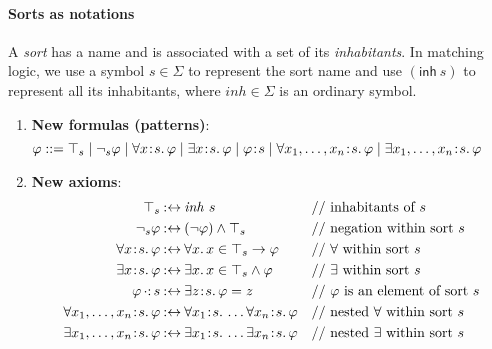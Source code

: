 \documentclass{article}
\theoremstyle{plain}
\theoremstyle{definition}
\newcommand{\cln}{{\kern0.2ex:\kern0.2ex}}
\newcommand{\ld}{\mathord{.\,}}
\newcommand{\imp}{\to}
\newcommand{\inh}[1]{\top_{#1}}
\newcommand{\eqbynot}{\mathbin{{:}{\leftrightarrow}}}
\newcommand{\elOfSort}{\mathop{\cdot{:}}}
\begin{document}
\paragraph{Sorts as notations\\}
A \emph{sort} has a name and 
is associated with a set of its \emph{inhabitants}. 
In matching logic, we use a symbol $s \in \Sigma$ to represent the sort name
and use $(\mathsf{inh} \ s)$ to represent all its inhabitants,
where $\mathit{inh} \in \Sigma$ is an ordinary symbol.
\begin{enumerate}
\item \textbf{New formulas (patterns)}: 
\[\hspace{-5ex}
\varphi ::= \inh{s} \mid \neg_s \varphi \mid \forall x \cln s \ld \varphi \mid
\exists x \cln s \ld \varphi \mid \varphi \cln s \mid \forall x_1,\dots,x_n \cln s \ld \varphi \mid \exists x_1,\dots,x_n \cln s \ld \varphi
\]
\item \textbf{New axioms}:
\begin{align*}
\inh{s} & \eqbynot \mathit{inh} \  s
&& \textrm{// inhabitants of $s$}\\
\neg_s \varphi & \eqbynot (\neg \varphi) \wedge \inh{s}
&& \textrm{// negation within sort $s$}\\
\forall x \cln s \ld \varphi & \eqbynot \forall x \ld x \in \inh{s} \imp \varphi
&& \textrm{// $\forall$ within sort $s$}\\
\exists x \cln s \ld \varphi & \eqbynot \exists x \ld x \in \inh{s} \land \varphi
&& \textrm{// $\exists$ within sort $s$}\\
\varphi \elOfSort s & \eqbynot \exists z \cln s \ld \varphi = z
&& \textrm{// $\varphi$ is an element of sort $s$}\\
\forall x_1,\dots,x_n \cln s \ld \varphi & \eqbynot  \forall x_1 \cln s \ld \dots \forall x_n \cln s \ld \varphi
&& \textrm{// nested $\forall$ within sort $s$}\\
\exists x_1,\dots,x_n \cln s \ld \varphi & \eqbynot \exists x_1 \cln s \ld \dots \exists x_n \cln s \ld \varphi
&& \textrm{// nested $\exists$ within sort $s$}
\end{align*}
\end{enumerate}
\end{document}
